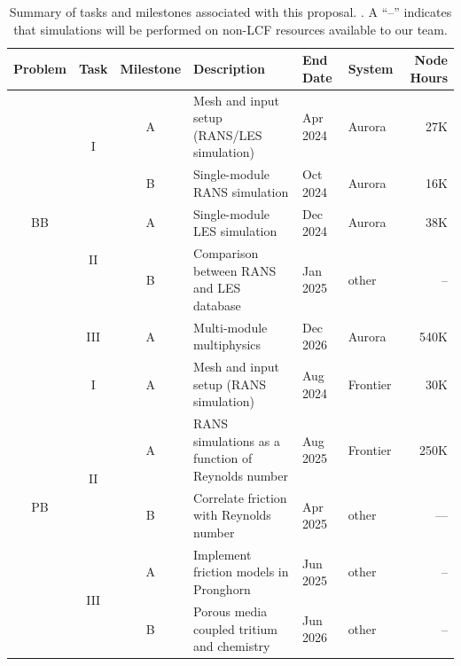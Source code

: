 
\begin{table}[h!]
\footnotesize
\centering
\caption{\small Summary of tasks and milestones associated with this proposal. . A ``--'' indicates that simulations will be performed on non-LCF resources available to our team.
}
\begin{tabular}{c c c l l l r}
\toprule
Problem & Task & Milestone & Description & End Date & System & Node Hours\\
\midrule
\multirow{5}{*}{BB} & \multirow{2}{*}{I} & A & Mesh and input setup (RANS/LES simulation) & Apr 2024 & Aurora & 27K \\
& & B & Single-module RANS simulation  & Oct 2024 & Aurora & 16K\\\cmidrule{2-7}
& \multirow{2}{*}{II} &A & Single-module LES simulation & Dec 2024 & Aurora & 38K\\
& & B & Comparison between RANS and LES database & Jan 2025 & other & --\\\cmidrule{2-7}
& \multirow{1}{*}{III} & A & Multi-module multiphysics & Dec 2026 & Aurora & 540K\\
\midrule
\multirow{5}{*}{PB} & \multirow{1}{*}{I} & A & Mesh and input setup (RANS simulation) & Aug 2024 & Frontier & 30K \\\cmidrule{2-7}
& \multirow{2}{*}{II} & A & RANS simulations as a function of Reynolds number & Aug 2025 & Frontier & 250K \\
&  & B & Correlate friction with Reynolds number & Apr 2025 & other & --- \\
\cmidrule{2-7}
& \multirow{2}{*}{III} & A & Implement friction models in Pronghorn & Jun 2025 & other &  -- \\
&  & B & Porous media coupled tritium and chemistry & Jun 2026 & other &  -- \\
\bottomrule
\end{tabular}
\label{tab:milestones2}
\end{table}

